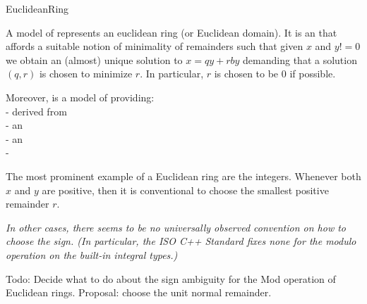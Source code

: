 \begin{ccRefConcept}{EuclideanRing}


\ccDefinition

A model of  represents an euclidean ring (or Euclidean domain). 
It is an  that affords a suitable notion of minimality of remainders 
such that given $x$ and $y != 0$ we obtain an (almost) unique solution to 
$x = qy + r by$ demanding that a solution $(q,r)$ is chosen to minimize $r$. 
In particular, $r$ is chosen to be $0$ if possible.

Moreover,  is a model of 
 providing:\\
 
-  derived from  \\
-  an \\
-  an \\
- \\





The most prominent example of a Euclidean ring are the integers. 
Whenever both $x$ and $y$ are positive, then it is conventional to choose 
the smallest positive remainder $r$. 


{\em \small
In other cases, there seems to be no universally observed convention on how to choose 
the sign. (In particular, the ISO C++ Standard fixes none for the modulo operation 
on the built-in integral types.)

Todo: Decide what to do about the sign ambiguity for the Mod operation of Euclidean rings.
Proposal: choose the unit normal remainder. 
}



\ccRefines


\end{ccRefConcept}
